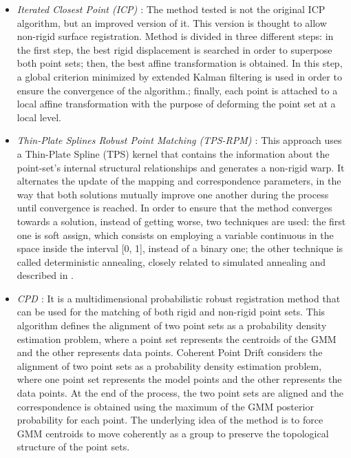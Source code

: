 \begin{itemize}
 \item \textit{Iterated Closest Point (ICP) \citep{besl1992method, feldmar1996rigid}}: The method tested 
is not the original ICP algorithm, but an improved version of it. This version is thought to allow non-rigid surface 
registration. Method is divided in three different steps: in the first step, the best rigid displacement is searched 
in order to superpose both point sets; then, the best affine transformation is obtained. In this step, a global 
criterion minimized by extended Kalman filtering is used in order to ensure the convergence of the algorithm.; finally, 
each point is attached to a local affine transformation with the purpose of deforming the point set at a local level. 
 \item \textit{Thin-Plate Splines Robust Point Matching (TPS-RPM) \citep{chui2000new}}: This approach uses a Thin-Plate Spline (TPS) kernel that contains the information about the point-set's internal structural relationships and generates a non-rigid warp.
 It alternates the update of the mapping and correspondence parameters, in the way that both solutions mutually improve one another during the process until convergence is reached. In order to ensure that the method converges towards a solution, instead of getting worse, two techniques are used: the first one is soft assign, which consists on employing a variable continuous in the space inside the interval [0, 1], instead of a binary one; the other technique is called deterministic annealing, closely related to simulated annealing and described in \cite{geiger1991parallel}.
 \item \textit{\acf{CPD} \citep{myronenko2010point}}: It is a multidimensional probabilistic robust registration method that can be used for the matching of both rigid and non-rigid point sets. This algorithm defines the alignment of two point sets as a probability density estimation problem, where a point set represents the centroids of the \ac{GMM} and the other represents data points. Coherent Point Drift considers the alignment of two point sets as a probability density estimation problem, where one point set represents the model points and the other represents the data points. At the end of the process, the two point sets are aligned and the correspondence is obtained using the maximum of the \ac{GMM} posterior probability for each point. The underlying idea of the method is to force \ac{GMM} centroids to move coherently as a group to preserve the topological structure of the point sets.

\end{itemize}
